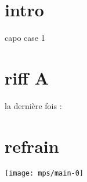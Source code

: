 \documentclass[11pt]{article}
\begin{document}
    \begin{center}
    \end{center}
    \section*{intro}

    \textrightarrow capo case 1

    


    \section{riff A}
    

    la derni\`ere fois :

    


    \section{refrain}
    \texttt{[image: mps/main-0]}


    \newpage
    




%    


%    
\end{document}

